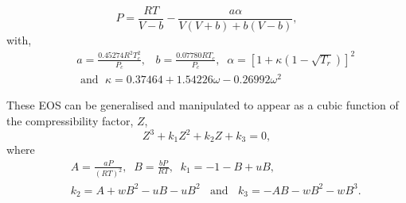 \documentclass[12pts,a4paper,amsmath,amssymb,floatfix]{article}%
\newcommand{\frc}{\displaystyle\frac}
\begin{document}
\begin{enumerate}[i)]
\begin{enumerate}[a)]
\begin{enumerate}[c.1)]
                           \begin{equation}
                               P = \frc{R T}{V-b} - \frc{a\alpha}{V\left(V+b\right)+b\left(V-b\right)},\label{Mod02_PREOS}
                           \end{equation}
                           with,
                          \begin{eqnarray}
                              && a = \frc{0.45274 R^{2}T_{c}^{2}}{P_{c}},\;\;\;b = \frc{0.07780 R T_{c} }{P_{c}},\;\;\alpha = \left[1 + \kappa\left(1-\sqrt{T_{r}}\right)\right]^{2}  \nonumber \\
                              &&\text{ and }\; \kappa = 0.37464 + 1.54226\omega - 0.26992\omega^{2} \nonumber
                          \end{eqnarray}                
%
                   \end{enumerate}
                   These EOS can be generalised and manipulated to appear as a cubic function of the compressibility factor, $Z$,
                   \begin{equation}
                      Z^{3} + k_{1} Z^{2} +k_{2} Z + k_{3} = 0,\label{Mod02_GeneralEOS}
                   \end{equation}
                   where
                   \begin{eqnarray}
                     && A = \frc{aP}{\left(RT\right)^{2}},\;\; B = \frc{bP}{RT},\;\; k_{1} = -1 -B + uB, \nonumber \\
                     && k_{2} = A + w B^{2} - uB -uB^{2}\;\;\text{ and }\;\; k_{3} = - AB -w B^{2} -w B^{3}.\nonumber
                   \end{eqnarray}


\end{enumerate}
\end{enumerate}
\end{document}
